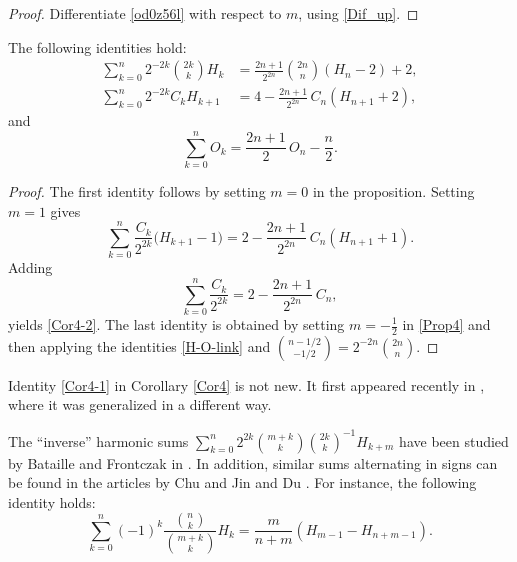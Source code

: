 \documentclass[12pt,reqno]{article}
\begin{document}
\begin{proof}
Differentiate \eqref{od0z56l} with respect to $m$, using \eqref{Dif_up}.
\end{proof}
\begin{corollary}\label{Cor4} 
The following identities hold:
\begin{align}
\sum_{k = 0}^n 2^{- 2k} \binom{{2k}}{k} H_k &= \frac{{2n + 1}}{{2^{2n} }}\binom{{2n}}{n}( H_n  - 2) + 2,\label{Cor4-1}\\
\sum_{k = 0}^n 2^{- 2k} C_k H_{k+1} &= 4 - \frac{2n + 1}{2^{2n}}\,C_n ( H_{n + 1} + 2),\label{Cor4-2}
\end{align}
and
\begin{equation}
\sum_{k = 0}^n {O_k } = \frac{2n+1}{2}\,O_n - \frac{n}{2}.\label{Cor4-3}
\end{equation}
\end{corollary}
\begin{proof}
The first identity follows by setting $m=0$ in the proposition. Setting $m=1$ gives
\[ \sum_{k=0}^n\frac{C_k}{2^{2k}}\bigl(H_{k+1}-1\bigr) = 2-\frac{2n+1}{2^{2n}}\,C_n(H_{n+1}+1).\]
Adding
\[ \sum_{k=0}^n\frac{C_k}{2^{2k}} = 2-\frac{2n+1}{2^{2n}}\,C_n,\]
yields \eqref{Cor4-2}. 
The last identity is obtained by setting $m=-\frac12$ in \eqref{Prop4} and then applying the identities 
\eqref{H-O-link}  
and $\binom{n-1/2}{-1/2} = 2^{-2n}\binom{2n}{n}$.
\end{proof}
\begin{remark}
Identity \eqref{Cor4-1} in Corollary \ref{Cor4} is not new. It first appeared recently in \cite[Theorem 2]{Adegoke}, where it was generalized in a different way.
\end{remark}
\begin{remark}
The ``inverse'' harmonic sums
$
\sum\limits_{k=0}^n 2^{2k} {\binom{m+k}{k}}{\binom{2k}{k}}^{-1} H_{k+m}
$
have been studied by Bataille and Frontczak in {\rm\cite{Bataille}}. In addition, similar sums alternating in signs can be found 
in the articles by Chu \cite{Chu} and Jin and Du \cite{Jin}. For instance, the following identity holds:
\begin{equation*}
\sum_{k=0}^n (-1)^k \frac{\binom{n}{k}}{\binom{m+k}{k}} H_k = \frac{m}{n+m} ( H_{m-1} - H_{n+m-1}).
\end{equation*}
\end{remark}
\end{document}
